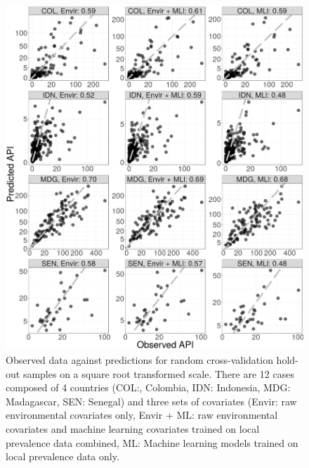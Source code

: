 \documentclass[review]{elsarticle}
\begin{document}
\begin{figure}
  \includegraphics[width=\textwidth]{figs/cv1_l_scatter.png}
\caption{
  Observed data against predictions for random cross-validation hold-out samples on a square root transformed scale. 
  There are 12 cases composed of 4 countries (COL:, Colombia, IDN: Indonesia, MDG: Madagascar, SEN: Senegal) and three sets of covariates (Envir: raw environmental covariates only, Envir +  ML: raw environmental covariates and machine learning covariates trained on local prevalence data combined, ML: Machine learning models trained on local prevalence data only.
}
\label{f:scatter1}
\end{figure}
\end{document}
